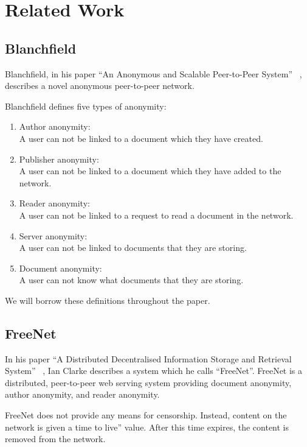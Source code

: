 \chapter{Related Work}

\section{Blanchfield}

Blanchfield, in his paper ``An Anonymous and Scalable Peer-to-Peer System'' ~\cite{blanchfield},
describes a novel anonymous peer-to-peer network.

Blanchfield defines five types of anonymity:
\begin{enumerate}
    \item{Author anonymity: \\
        A user can not be linked to a document which they have created.
    }
    \item{Publisher anonymity: \\
        A user can not be linked to a document which they have added to the network.
    }
    \item{Reader anonymity: \\
        A user can not be linked to a request to read a document in the network.
    }
    \item{Server anonymity: \\
        A user can not be linked to documents that they are storing.
    }
    \item{Document anonymity: \\
        A user can not know what documents that they are storing.
    }
\end{enumerate}

We will borrow these definitions throughout the paper.

\section{FreeNet}

In his paper ``A Distributed Decentralised Information Storage and Retrieval System'' ~\cite{freenet},
Ian Clarke describes a system which he calls ``FreeNet''. FreeNet is a distributed, peer-to-peer web
serving system providing document anonymity, author anonymity, and reader anonymity.

FreeNet does not provide any means for censorship. Instead, content on the network is given a
time to live'' value. After this time expires, the content is removed from the network.

